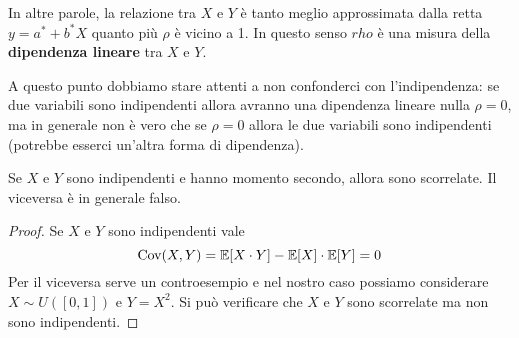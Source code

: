 In altre parole, la relazione tra $X$ e $Y$ è tanto meglio approssimata dalla retta $y=a^*+b^*X$
quanto più $\rho$ è vicino a 1. In questo senso $rho$ è una misura della \textbf{dipendenza lineare}
tra $X$ e $Y$.

A questo punto dobbiamo stare attenti a non confonderci con l'indipendenza: se due variabili sono
indipendenti allora avranno una dipendenza lineare nulla $\rho=0$, ma in generale non è vero che
se $\rho=0$ allora le due variabili sono indipendenti (potrebbe esserci un'altra forma di
dipendenza).

\begin{proposition}
	Se $X$ e $Y$ sono indipendenti e hanno momento secondo, allora sono scorrelate. Il viceversa è
	in generale falso.
	\begin{proof}
		Se $X$ e $Y$ sono indipendenti vale
		\[ \operatorname{Cov}(X,Y) = \mathbb{E}[X \cdot Y] - \mathbb{E}[X] \cdot \mathbb{E}[Y] = 0 \]
		Per il viceversa serve un controesempio e nel nostro caso possiamo considerare
		$X \sim U([0,1])$ e $Y = X^2$. Si può verificare che $X$ e $Y$ sono scorrelate ma non sono
		indipendenti.
	\end{proof}
\end{proposition}
